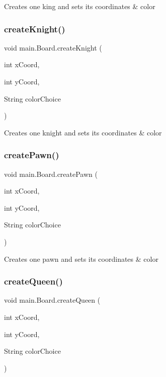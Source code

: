Creates one king and sets its coordinates \& color \mbox{\label{classmain_1_1_board_a3196684b770b7999e374da1b55118094}} 
\subsubsection{\texorpdfstring{create\+Knight()}{createKnight()}}
{\footnotesize\ttfamily void main.\+Board.\+create\+Knight (\begin{DoxyParamCaption}\item[{int}]{x\+Coord,  }\item[{int}]{y\+Coord,  }\item[{String}]{color\+Choice }\end{DoxyParamCaption})\hspace{0.3cm}{\ttfamily [inline]}}

Creates one knight and sets its coordinates \& color \mbox{\label{classmain_1_1_board_a433581909511ffb611818397c0d3d59b}} 
\subsubsection{\texorpdfstring{create\+Pawn()}{createPawn()}}
{\footnotesize\ttfamily void main.\+Board.\+create\+Pawn (\begin{DoxyParamCaption}\item[{int}]{x\+Coord,  }\item[{int}]{y\+Coord,  }\item[{String}]{color\+Choice }\end{DoxyParamCaption})\hspace{0.3cm}{\ttfamily [inline]}}

Creates one pawn and sets its coordinates \& color \mbox{\label{classmain_1_1_board_aa0957c5b4653c450307263bc89fa1bba}} 
\subsubsection{\texorpdfstring{create\+Queen()}{createQueen()}}
{\footnotesize\ttfamily void main.\+Board.\+create\+Queen (\begin{DoxyParamCaption}\item[{int}]{x\+Coord,  }\item[{int}]{y\+Coord,  }\item[{String}]{color\+Choice }\end{DoxyParamCaption})\hspace{0.3cm}{\ttfamily [inline]}}

